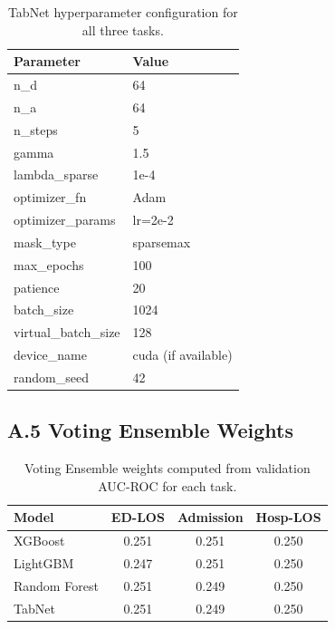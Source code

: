 \documentclass[11pt]{article}
\begin{document}
\begin{table}[H]
\centering
\caption{TabNet hyperparameter configuration for all three tasks.}
\begin{tabular}{@{}ll@{}}
\toprule
\textbf{Parameter} & \textbf{Value} \\
\midrule
n\_d & 64 \\
n\_a & 64 \\
n\_steps & 5 \\
gamma & 1.5 \\
lambda\_sparse & 1e-4 \\
optimizer\_fn & Adam \\
optimizer\_params & lr=2e-2 \\
mask\_type & sparsemax \\
max\_epochs & 100 \\
patience & 20 \\
batch\_size & 1024 \\
virtual\_batch\_size & 128 \\
device\_name & cuda (if available) \\
random\_seed & 42 \\
\bottomrule
\end{tabular}
\end{table}

\subsection{A.5 Voting Ensemble Weights}

\begin{table}[H]
\centering
\caption{Voting Ensemble weights computed from validation AUC-ROC for each task.}
\begin{tabular}{@{}lccc@{}}
\toprule
\textbf{Model} & \textbf{ED-LOS} & \textbf{Admission} & \textbf{Hosp-LOS} \\
\midrule
XGBoost & 0.251 & 0.251 & 0.250 \\
LightGBM & 0.247 & 0.251 & 0.250 \\
Random Forest & 0.251 & 0.249 & 0.250 \\
TabNet & 0.251 & 0.249 & 0.250 \\
\bottomrule
\end{tabular}
\end{table}

\end{document}
